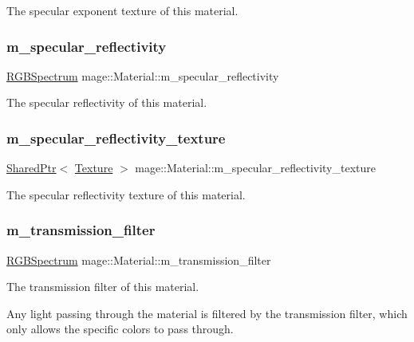 The specular exponent texture of this material. \hypertarget{structmage_1_1_material_a45587388f4ff57c209de2280b71af9d3}{}\label{structmage_1_1_material_a45587388f4ff57c209de2280b71af9d3} 
\subsubsection{\texorpdfstring{m\+\_\+specular\+\_\+reflectivity}{m\_specular\_reflectivity}}
{\footnotesize\ttfamily \hyperlink{structmage_1_1_r_g_b_spectrum}{R\+G\+B\+Spectrum} mage\+::\+Material\+::m\+\_\+specular\+\_\+reflectivity}

The specular reflectivity of this material. \hypertarget{structmage_1_1_material_ac925df9d71f8668c03e8efada632b300}{}\label{structmage_1_1_material_ac925df9d71f8668c03e8efada632b300} 
\subsubsection{\texorpdfstring{m\+\_\+specular\+\_\+reflectivity\+\_\+texture}{m\_specular\_reflectivity\_texture}}
{\footnotesize\ttfamily \hyperlink{namespacemage_a1e01ae66713838a7a67d30e44c67703e}{Shared\+Ptr}$<$ \hyperlink{classmage_1_1_texture}{Texture} $>$ mage\+::\+Material\+::m\+\_\+specular\+\_\+reflectivity\+\_\+texture}

The specular reflectivity texture of this material. \hypertarget{structmage_1_1_material_a9573a0d2a5fb0322f9eb103ace34dd47}{}\label{structmage_1_1_material_a9573a0d2a5fb0322f9eb103ace34dd47} 
\subsubsection{\texorpdfstring{m\+\_\+transmission\+\_\+filter}{m\_transmission\_filter}}
{\footnotesize\ttfamily \hyperlink{structmage_1_1_r_g_b_spectrum}{R\+G\+B\+Spectrum} mage\+::\+Material\+::m\+\_\+transmission\+\_\+filter}

The transmission filter of this material.

Any light passing through the material is filtered by the transmission filter, which only allows the specific colors to pass through. 